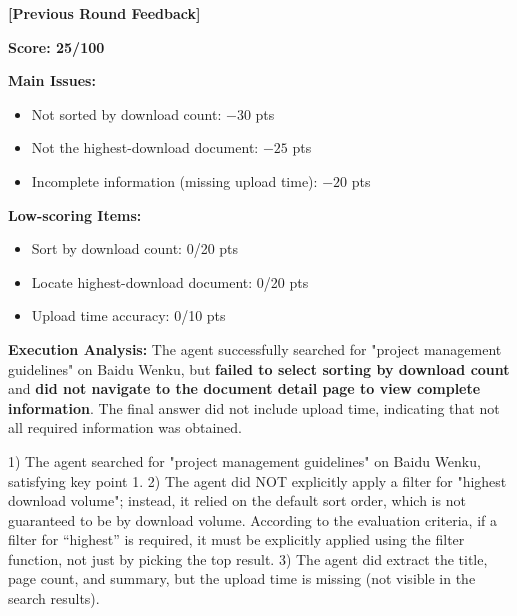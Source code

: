 \begin{tcolorbox}[
  title={LexJudge Feedback (Score: $25 \rightarrow 60$, partially recovered)},
  colback=white,
  colframe=tableblueTitle,
  colbacktitle=tableblueTitle,
  coltitle=white,
  fonttitle=\bfseries,
  breakable,
  enhanced,
  boxrule=1.2pt,
  arc=1.5mm
]
\small
\textbf{[Previous Round Feedback]}

\textbf{Score: 25/100}

\textbf{Main Issues:}
\begin{itemize}[leftmargin=*, nosep]
    \item Not sorted by download count: $-30$ pts
    \item Not the highest-download document: $-25$ pts
    \item Incomplete information (missing upload time): $-20$ pts
\end{itemize}

\textbf{Low-scoring Items:}
\begin{itemize}[leftmargin=*, nosep]
    \item Sort by download count: 0/20 pts
    \item Locate highest-download document: 0/20 pts
    \item Upload time accuracy: 0/10 pts
\end{itemize}

\textbf{Execution Analysis:}
The agent successfully searched for "project management guidelines" on Baidu Wenku, but \textbf{failed to select sorting by download count} and \textbf{did not navigate to the document detail page to view complete information}. The final answer did not include upload time, indicating that not all required information was obtained.
\end{tcolorbox}

\begin{tcolorbox}[
  title={WebJudge Feedback (Score: $0 \rightarrow 0$, no improvement)},
  colback=white,
  colframe=gray,
  colbacktitle=gray,
  coltitle=white,
  fonttitle=\bfseries,
  breakable,
  enhanced,
boxrule=1.2pt,
  arc=1.5mm
]
\small
1) The agent searched for "project management guidelines" on Baidu Wenku, satisfying key point 1. 2) The agent did NOT explicitly apply a filter for "highest download volume"; instead, it relied on the default sort order, which is not guaranteed to be by download volume. According to the evaluation criteria, if a filter for ``highest'' is required, it must be explicitly applied using the filter function, not just by picking the top result. 3) The agent did extract the title, page count, and summary, but the upload time is missing (not visible in the search results).
\end{tcolorbox}

